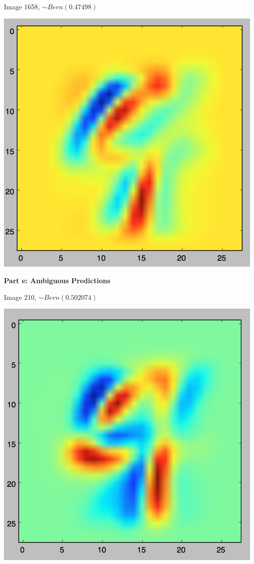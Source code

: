 \documentclass[twoside,11pt]{homework}
\begin{document}
Image 1658, $\sim Bern(0.47498)$

\includegraphics[scale=.5]{images/1658.png}

\textbf{Part e: Ambiguous Predictions}

Image 210, $\sim Bern(0.502074)$

\includegraphics[scale=.5]{images/210.png}
\end{document}
